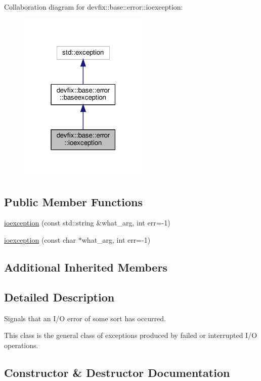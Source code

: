 Collaboration diagram for devfix\+:\+:base\+:\+:error\+:\+:ioexception\+:
\nopagebreak
\begin{figure}[H]
\begin{center}
\leavevmode
\includegraphics[width=175pt]{structdevfix_1_1base_1_1error_1_1ioexception__coll__graph}
\end{center}
\end{figure}
\subsection*{Public Member Functions}
\begin{DoxyCompactItemize}
\item 
\hyperlink{structdevfix_1_1base_1_1error_1_1ioexception_acaf6aa89dc63021cbf6241b897c570da}{ioexception} (const std\+::string \&what\+\_\+arg, int err=-\/1)
\item 
\hyperlink{structdevfix_1_1base_1_1error_1_1ioexception_a93e7dfc50605b9f6a9c5cd78dac59a44}{ioexception} (const char $\ast$what\+\_\+arg, int err=-\/1)
\end{DoxyCompactItemize}
\subsection*{Additional Inherited Members}


\subsection{Detailed Description}
Signals that an I/O error of some sort has occurred. 

This class is the general class of exceptions produced by failed or interrupted I/O operations. 

\subsection{Constructor \& Destructor Documentation}
\mbox{\label{structdevfix_1_1base_1_1error_1_1ioexception_acaf6aa89dc63021cbf6241b897c570da}} 
